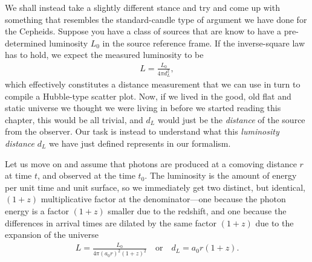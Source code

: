 We shall instead take a slightly different stance and try and come up with something
that resembles the standard-candle type of argument we have done for the Cepheids.
Suppose you have a class of sources that are know to have a pre-determined
luminosity $L_0$ in the source reference frame.
If the inverse-square law has to hold, we expect the measured luminosity to be
\begin{align*}
  L = \frac{L_0}{4\pi d_L^2},
\end{align*}
which effectively constitutes a distance measurement that we can use in turn to
compile a Hubble-type scatter plot. Now, if we lived in the good, old flat and
static universe we thought we were living in before we started reading this chapter,
this would be all trivial, and $d_L$ would just be the \emph{distance} of the source
from the observer. Our task is instead to understand what this \emph{luminosity distance}
$d_L$ we have just defined represents in our formalism.

Let us move on and assume that photons are produced at a comoving distance $r$ at
time $t$, and observed at the time $t_0$. The luminosity is the amount of energy
per unit time and unit surface, so we immediately get two distinct, but identical,
$(1 + z)$ multiplicative factor at the denominator---one because the photon energy
is a factor $(1 + z)$ smaller due to the redshift, and one because the differences
in arrival times are dilated by the same factor $(1 + z)$ due to the expansion of
the universe
\begin{align*}
  L = \frac{L_0}{4\pi (a_0 r)^2 (1 + z)^2} \quad\text{or}\quad d_L = a_0 r (1 + z).
\end{align*}

